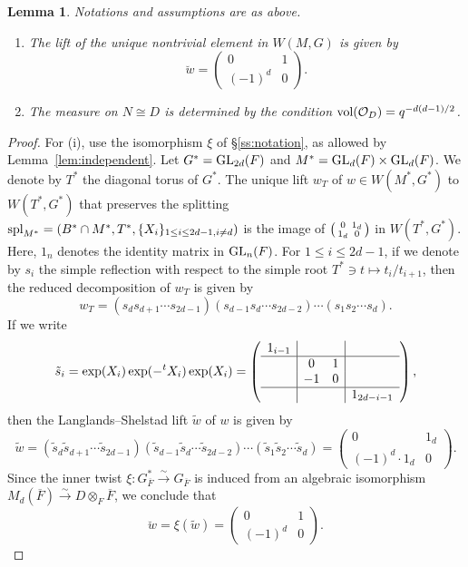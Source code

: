 \documentclass[11pt,reqno]{amsart}
\theoremstyle{plain}
\newtheorem{lem}[thm]{Lemma}
\theoremstyle{definition}
\newcommand{\cO}{\mathcal{O}}
\newcommand{\GL}{\tu{GL}}
\newcommand{\vol}{\tu{vol}}
\newcommand{\tu}{\textup}
\numberwithin{equation}{subsection}
\begin{document}
\begin{lem}\label{lem:lift-and-vol}
Notations and assumptions are as above.
\begin{enumerate}
    \item The lift of the unique nontrivial element in $W(M,G)$ is given by 
    \[
    \breve{w} = \begin{pmatrix}
        0 & 1 \\ (-1)^d & 0
    \end{pmatrix}.
    \]
    \item
    The measure on $N \cong D$ is determined by the condition $\vol(\cO_D) = q^{-d(d-1)/2}$.
\end{enumerate}
\end{lem}
\begin{proof}
For (i), use the isomorphism $\xi$ of \S\ref{ss:notation}, as allowed by
Lemma~\ref{lem:independent}.
Let $G^* = \GL_{2d}(F)$ and $M^* = \GL_d(F) \times \GL_d(F)$. 
We denote by $T^*$ the diagonal torus of $G^*$.
The unique lift $w_T$ of $w\in W(M^*,G^*)$ to $W(T^*,G^*)$
that preserves the splitting 
$\tu{spl}_{M^*} = (B^* \cap M^*, T^*, \{X_i\}_{1 \leq i \leq 2d-1, i \not= d})$
is the image of $\begin{psmallmatrix}
    0 & 1_d \\ 1_d & 0
\end{psmallmatrix}$ in $W(T^*,G^*)$. 
Here, $1_n$ denotes the identity matrix in $\GL_n(F)$.
For $1 \leq i \leq 2d-1$, 
if we denote by $s_i$
the simple reflection with respect to the simple root 
$T^* \ni t \mapsto t_i/t_{i+1}$, 
then the reduced decomposition of $w_T$ is given by 
\[
w_T = (s_ds_{d+1} \cdots s_{2d-1})
(s_{d-1}s_d \cdots s_{2d-2}) 
\cdots (s_1s_2 \cdots s_d).
\]
If we write 
\[
\tilde{s}_i = \exp(X_i) \exp(-{}^tX_i) \exp(X_i)
= \left(\begin{array}{c|cc|c}
     1_{i-1}&&&  \cr \hline
     &0&1& \cr
     &-1&0& \cr \hline
     &&&1_{2d-i-1}
\end{array}\right), 
\]
then the Langlands--Shelstad lift $\tilde{w}$ of $w$ is given by 
\[
\tilde{w} = (\tilde{s}_d\tilde{s}_{d+1} \cdots \tilde{s}_{2d-1})
(\tilde{s}_{d-1}\tilde{s}_d \cdots \tilde{s}_{2d-2}) 
\cdots (\tilde{s}_1\tilde{s}_2 \cdots \tilde{s}_d)
= \begin{pmatrix}
    0 & 1_d \\ 
    (-1)^d \cdot 1_d & 0
\end{pmatrix}.
\]
Since the inner twist $\xi \colon G^*_{\overline{F}} \xrightarrow{\sim} G_{\overline{F}}$ 
is induced from an algebraic isomorphism 
$M_d(\overline{F}) \xrightarrow{\sim} D \otimes_F \overline{F}$, 
we conclude that 
\[
\breve{w} = \xi(\tilde{w}) = \begin{pmatrix}
0 & 1 \\ (-1)^d & 0
\end{pmatrix}.
\]
\par


\end{proof}
\end{document}
